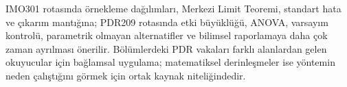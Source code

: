 IMO301 rotasında örnekleme dağılımları, Merkezi Limit Teoremi, standart hata
ve çıkarım mantığına; PDR209 rotasında etki büyüklüğü, ANOVA, varsayım
kontrolü, parametrik olmayan alternatifler ve bilimsel raporlamaya daha çok
zaman ayrılması önerilir. Bölümlerdeki PDR vakaları farklı alanlardan gelen
okuyucular için bağlamsal uygulama; matematiksel derinleşmeler ise yöntemin
neden çalıştığını görmek için ortak kaynak niteliğindedir.